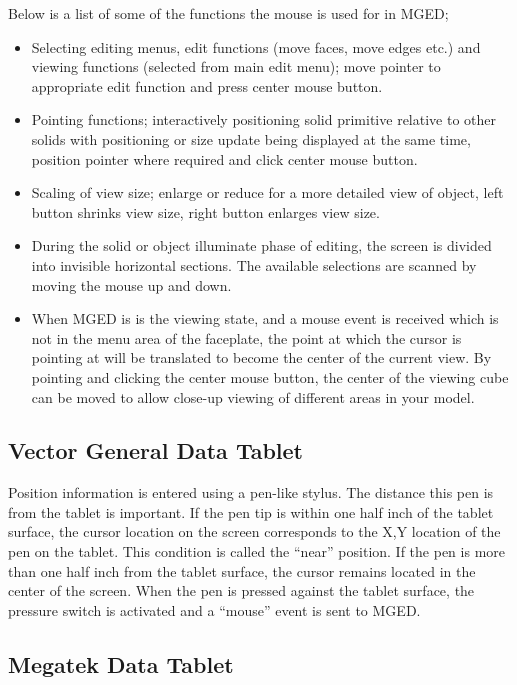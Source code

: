 Below is a list of some of the functions the mouse is used for in MGED;
\begin{itemize}
\item
Selecting editing menus, edit functions (move faces, move edges
etc.) and viewing functions (selected from main edit menu); move
pointer to appropriate edit function and press center mouse button.
\item
Pointing functions; interactively positioning solid primitive 
relative to other solids with positioning or size update being 
displayed at the same time, position pointer where required and click
center mouse button.
\item
Scaling of view size; enlarge or reduce for a more detailed view of
object, left button shrinks view size, right button enlarges view
size.
\item
During the solid or object illuminate phase of editing,
the screen is divided into
invisible horizontal sections.
The available selections are scanned by moving the mouse up and down.
\item
When MGED is is the viewing state,
and a mouse event is received which is not in the menu area of the faceplate,
the point at which the cursor is pointing at will be translated to become
the center of the current view.
By pointing and clicking the center mouse button,
the center of the viewing cube
can be moved to allow close-up viewing of different areas in your
model.
\end{itemize}

\subsection{Vector General Data Tablet}

Position information is entered using a pen-like stylus.
The distance this pen is from the tablet is important.
If the pen tip is within one half inch of the tablet surface, the cursor
location on the screen corresponds to the X,Y location of the
pen on the tablet.  This condition is called the ``near'' position.
If the pen is more than one half inch from the tablet surface, the
cursor remains located in the center of the screen.
When the pen is pressed against the tablet surface,
the pressure switch is activated and a ``mouse'' event
is sent to MGED.

\subsection{Megatek Data Tablet}

